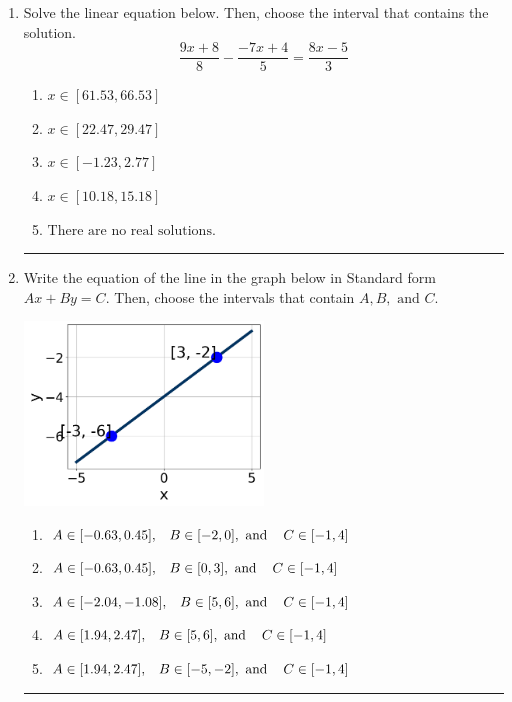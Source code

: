 \documentclass[14pt]{extbook}
\newcommand{\litem}[1]{\item#1\hspace*{-1cm}\rule{\textwidth}{0.4pt}}
\begin{document}
\begin{enumerate}
{\begin{enumerate}[label=\Alph*.]
\end{enumerate} }
\litem{
Solve the linear equation below. Then, choose the interval that contains the solution.\[ \frac{9x + 8}{8} - \frac{-7x + 4}{5} = \frac{8x -5}{3} \]\begin{enumerate}[label=\Alph*.]
\item \( x \in [61.53, 66.53] \)
\item \( x \in [22.47, 29.47] \)
\item \( x \in [-1.23, 2.77] \)
\item \( x \in [10.18, 15.18] \)
\item \( \text{There are no real solutions.} \)

\end{enumerate} }
\litem{
Write the equation of the line in the graph below in Standard form $Ax+By=C$. Then, choose the intervals that contain $A, B, \text{ and } C$.
\begin{center}
    \includegraphics[width=0.5\textwidth]{../Figures/linearGraphToStandardCopyB.png}
\end{center}
\begin{enumerate}[label=\Alph*.]
\item \( A \in [-0.63, 0.45], \hspace{3mm} B \in [-2, 0], \text{ and } \hspace{3mm} C \in [-1, 4] \)
\item \( A \in [-0.63, 0.45], \hspace{3mm} B \in [0, 3], \text{ and } \hspace{3mm} C \in [-1, 4] \)
\item \( A \in [-2.04, -1.08], \hspace{3mm} B \in [5, 6], \text{ and } \hspace{3mm} C \in [-1, 4] \)
\item \( A \in [1.94, 2.47], \hspace{3mm} B \in [5, 6], \text{ and } \hspace{3mm} C \in [-1, 4] \)
\item \( A \in [1.94, 2.47], \hspace{3mm} B \in [-5, -2], \text{ and } \hspace{3mm} C \in [-1, 4] \)


\end{enumerate}}
\end{enumerate}
\end{document}
